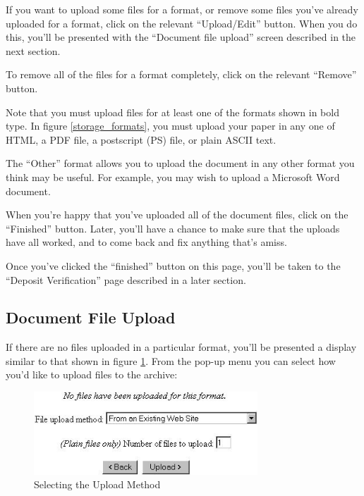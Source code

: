 If you want to upload some files for a format, or remove some files you've already uploaded for a format, click on the relevant ``Upload/Edit'' button. When you do this, you'll be presented with the ``Document file upload'' screen described in the next section.

To remove all of the files for a format completely, click on the relevant ``Remove'' button.

Note that you must upload files for at least one of the formats shown in bold type. In figure \ref{storage_formats}, you must upload your paper in any one of HTML, a PDF file, a postscript (PS) file, or plain ASCII text.

The ``Other'' format allows you to upload the document in any other format you think may be useful. For example, you may wish to upload a Microsoft Word document.

When you're happy that you've uploaded all of the document files, click on the ``Finished'' button. Later, you'll have a chance to make sure that the uploads have all worked, and to come back and fix anything that's amiss.

Once you've clicked the ``finished'' button on this page, you'll be taken to the ``Deposit Verification'' page described in a later section.


\subsection{Document File Upload}

If there are no files uploaded in a particular format, you'll be presented a display similar to that shown in figure \ref{upload_method}. From the pop-up menu you can select how you'd like to upload files to the archive:

\begin{figure}
\centerline{\includegraphics[width=3.3in]{images/upload-method}}
\caption{\label{upload_method} Selecting the Upload Method}
\end{figure}

